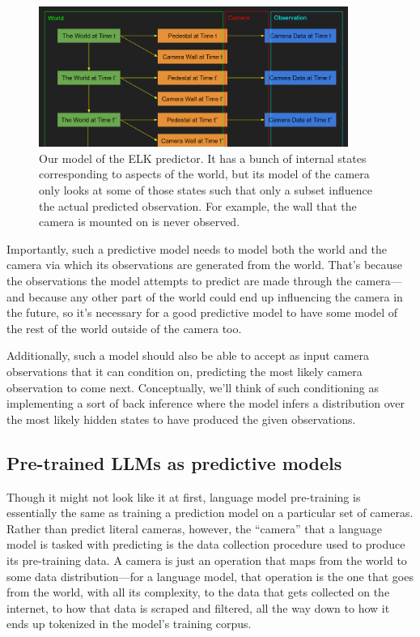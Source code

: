 \documentclass[
  onecolumn,
  nonatbib,
]{miri-tech-article}
\begin{document}
\begin{figure}[h!]
  \centering
  \includegraphics[width=0.9\textwidth]{OTzdgch.png}
  \caption{Our model of the ELK predictor. It has a bunch of internal states corresponding to aspects of the world, but its model of the camera only looks at some of those states such that only a subset influence the actual predicted observation. For example, the wall that the camera is mounted on is never observed.}
\end{figure}

Importantly, such a predictive model needs to model both the world and the camera via which its observations are generated from the world. That's because the observations the model attempts to predict are made through the camera---and because any other part of the world could end up influencing the camera in the future, so it's necessary for a good predictive model to have some model of the rest of the world outside of the camera too.

Additionally, such a model should also be able to accept as input camera observations that it can condition on, predicting the most likely camera observation to come next. Conceptually, we'll think of such conditioning as implementing a sort of back inference where the model infers a distribution over the most likely hidden states to have produced the given observations.


\subsection{Pre-trained LLMs as predictive models}

Though it might not look like it at first, language model pre-training is essentially the same as training a prediction model on a particular set of cameras. Rather than predict literal cameras, however, the ``camera'' that a language model is tasked with predicting is the data collection procedure used to produce its pre-training data. A camera is just an operation that maps from the world to some data distribution---for a language model, that operation is the one that goes from the world, with all its complexity, to the data that gets collected on the internet, to how that data is scraped and filtered, all the way down to how it ends up tokenized in the model's training corpus.
\end{document}
